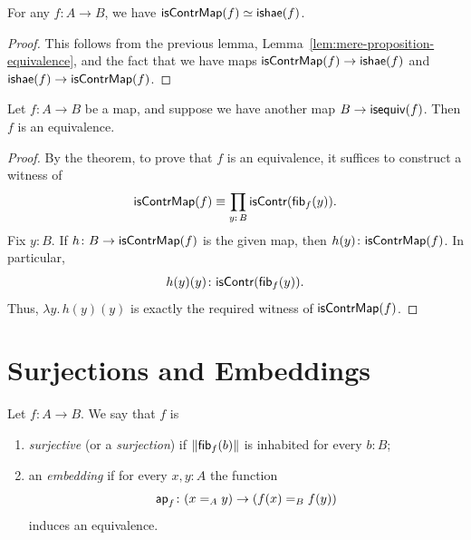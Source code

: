 \begin{thm}\we\label{thm:isContr-ishae-equivalence}
    For any\/ $f\colon A\to B$, we have\/ $\mathsf{isContrMap}(f)\simeq\mathsf{ishae}(f)$.
\end{thm}

\begin{proof}
    This follows from the previous lemma, Lemma~\ref{lem:mere-proposition-equivalence}, and the fact that we have maps $\mathsf{isContrMap}(f)\to\mathsf{ishae}(f)$ and $\mathsf{ishae}(f)\to\mathsf{isContrMap}(f)$.
    
\end{proof}

\begin{cor}\we\label{cor:map-followed-by-map-to-isequiv}
    Let\/ $f\colon A\to B$ be a map, and suppose we have another map\/ $B\to\mathsf{isequiv}(f)$. Then\/ $f$ is an equivalence.
\end{cor}

\begin{proof}
    By the theorem, to prove that $f$ is an equivalence, it suffices to construct a witness of
    \[
        \fun{isContrMap}(f)\equiv\prod_{y\colon B}\fun{isContr}(\fun{fib}_f(y)).
    \]
    Fix $y\colon B$. If $h\colon B\to\fun{isContrMap}(f)$ is the given map, then $h(y)\colon\fun{isContrMap}(f)$. In particular,
    \[
        h(y)(y)\colon\fun{isContr}(\fun{fib}_f(y)).
    \]
    Thus, $\lambda y.\,h(y)(y)$ is exactly the required witness of $\mathsf{isContrMap}(f)$.
    
\end{proof}

\section{Surjections and Embeddings}

\begin{defn}
    Let\/ $f\colon A\to B$. We say that\/ $f$ is
    \begin{enumerate}[-]
        \item \textsl{surjective} (or a \textsl{surjection}) if\/ $\lVert\mathsf{fib}_f(b)\rVert$ is inhabited for every\/ $b\colon B$;
        \item an \textsl{embedding} if for every\/ $x,y\colon A$ the function
        \[
            \fun{ap}_f\colon(x\eq Ay)\to(f(x)\eq Bf(y))
        \]
        induces an equivalence.
    \end{enumerate}
\end{defn}

